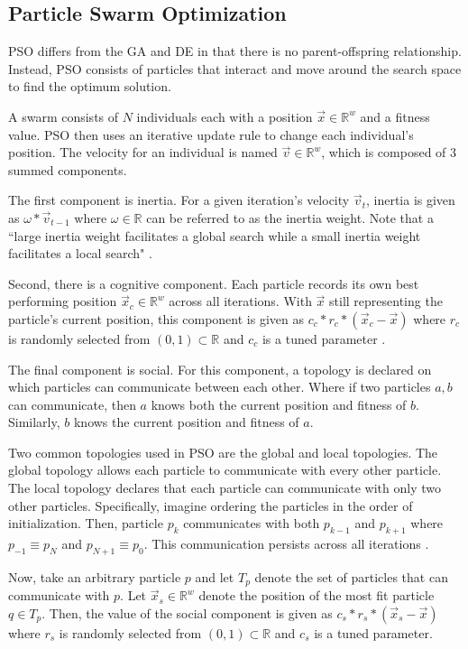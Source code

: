 \documentclass[twoside,11pt]{article}
\newcommand{\Rw}{\mathbb{R}^w }
\begin{document}
\subsection{Particle Swarm Optimization}

	PSO differs from the GA and DE in that there is no parent-offspring relationship. Instead, PSO consists of particles that interact and move around the search space to find the optimum solution. 
	
	A swarm consists of $N$ individuals each with a position $\vec{x} \in \Rw$ and a fitness value. 
	PSO then uses an iterative update rule to change each individual's position. The velocity for an individual is named $\vec{v} \in \Rw$, which is composed of 3 summed components.
	
	The first component is inertia. For a given iteration's velocity $\vec{v}_t$, inertia is given as $\omega * \vec{v}_{t-1}$ where $\omega \in \mathbb{R}$ can be referred to as the inertia weight. Note that a ``large inertia weight facilitates a global search while a small inertia weight facilitates a local search" \citep{empirical-pso}.
	
	Second, there is a cognitive component. 
	Each particle records its own best performing position $\vec{x}_c \in \Rw$ across all iterations. 
	With $\vec{x}$ still representing the particle's current position, this component is given as $c_c * r_c * (\vec{x}_c - \vec{x})$ where $r_c$ is randomly selected from $(0,1) \subset \mathbb{R}$ and $c_c$ is a tuned parameter \citep{og-pso}.
	
	The final component is social. 
	For this component, a topology is declared on which particles can communicate between each other.
	Where if two particles $a,b$ can communicate, then $a$ knows both the current position and fitness of $b$.
	Similarly, $b$ knows the current position and fitness of $a$.
	
	Two common topologies used in PSO are the global and local topologies. 
	The global topology allows each particle to communicate with every other particle. 
	The local topology declares that each particle can communicate with only two other particles.
	Specifically, imagine ordering the particles in the order of initialization.
	Then, particle $p_k$ communicates with both $p_{k-1}$ and $p_{k+1}$ where $p_{-1} \equiv p_N$ and $p_{N+1} \equiv p_{0}$.
	This communication persists across all iterations \citep{og-pso}.
	
	Now, take an arbitrary particle $p$ and let $T_p$ denote the set of particles that can communicate with $p$.
	Let $\vec{x}_s \in \Rw$ denote the position of the most fit particle $q \in T_p$. Then, the value of the social component is given as $c_s * r_s * (\vec{x}_s - \vec{x})$ where $r_s$ is randomly selected from $(0,1) \subset \mathbb{R}$ and $c_s$ is a tuned parameter.
	
\end{document}
